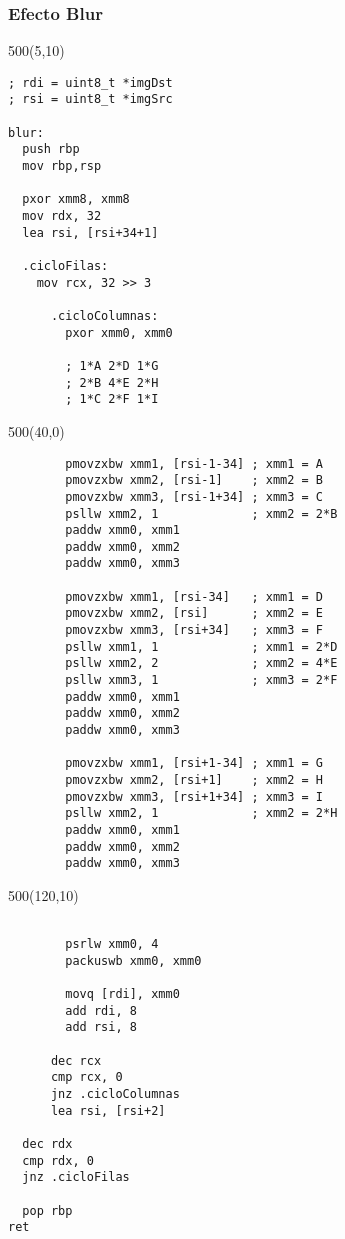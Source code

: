 \documentclass[aspectratio=169]{beamer}
\begin{document}
\begin{frame}[fragile]
    \frametitle{Efecto Blur}
    \scriptsize
    \begin{textblock}{500}(5,10)
    \begin{verbatim}
; rdi = uint8_t *imgDst
; rsi = uint8_t *imgSrc

blur:
  push rbp
  mov rbp,rsp
  
  pxor xmm8, xmm8
  mov rdx, 32
  lea rsi, [rsi+34+1]
  
  .cicloFilas:
    mov rcx, 32 >> 3
    
      .cicloColumnas:
        pxor xmm0, xmm0
        
        ; 1*A 2*D 1*G
        ; 2*B 4*E 2*H
        ; 1*C 2*F 1*I        
\end{verbatim}
    \end{textblock}
    \begin{textblock}{500}(40,0)
\begin{verbatim}
        pmovzxbw xmm1, [rsi-1-34] ; xmm1 = A
        pmovzxbw xmm2, [rsi-1]    ; xmm2 = B
        pmovzxbw xmm3, [rsi-1+34] ; xmm3 = C
        psllw xmm2, 1             ; xmm2 = 2*B
        paddw xmm0, xmm1
        paddw xmm0, xmm2
        paddw xmm0, xmm3

        pmovzxbw xmm1, [rsi-34]   ; xmm1 = D
        pmovzxbw xmm2, [rsi]      ; xmm2 = E
        pmovzxbw xmm3, [rsi+34]   ; xmm3 = F
        psllw xmm1, 1             ; xmm1 = 2*D
        psllw xmm2, 2             ; xmm2 = 4*E
        psllw xmm3, 1             ; xmm3 = 2*F
        paddw xmm0, xmm1
        paddw xmm0, xmm2
        paddw xmm0, xmm3

        pmovzxbw xmm1, [rsi+1-34] ; xmm1 = G
        pmovzxbw xmm2, [rsi+1]    ; xmm2 = H
        pmovzxbw xmm3, [rsi+1+34] ; xmm3 = I
        psllw xmm2, 1             ; xmm2 = 2*H
        paddw xmm0, xmm1
        paddw xmm0, xmm2
        paddw xmm0, xmm3
\end{verbatim}
    \end{textblock}
    \begin{textblock}{500}(120,10)
\begin{verbatim}

        psrlw xmm0, 4
        packuswb xmm0, xmm0

        movq [rdi], xmm0
        add rdi, 8
        add rsi, 8

      dec rcx
      cmp rcx, 0
      jnz .cicloColumnas
      lea rsi, [rsi+2]

  dec rdx
  cmp rdx, 0
  jnz .cicloFilas

  pop rbp
ret
    \end{verbatim}
    \end{textblock}
\end{frame}
\end{document}
